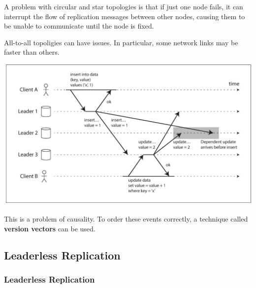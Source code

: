 \documentclass[11pt]{article}
\begin{document}
A problem with circular and star topologies is that if just one node fails, it can interrupt the
flow of replication messages between other nodes, causing them to be unable to communicate until
the node is fixed.

All-to-all topoligies can have issues. In particular, some network links may be faster than
others.
\begin{center}
\includegraphics[width=.9\textwidth]{../images/ddia/3.jpg}
\end{center}

This is a problem of causality. To order these events correctly, a technique called \textbf{version vectors} can be used.
\subsection{Leaderless Replication}
\label{sec:org224d1ee}
\subsubsection{Leaderless Replication}
\label{sec:orge822084}
\end{document}
